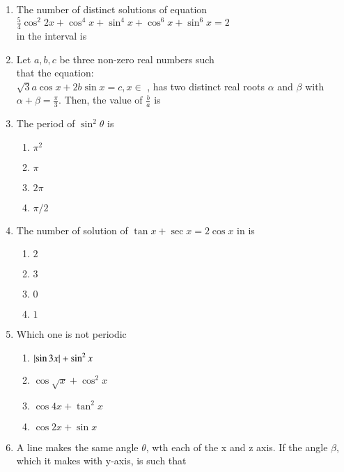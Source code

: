\begin{enumerate}[label=\thesubsection.\arabic*,ref=\thesubsection.\theenumi]
\item The number of distinct solutions of equation
$\frac{5}{4}\cos^2 2x+\cos^4 x+\sin^4 x+\cos^6 x+\sin^6 x=2$
\\in the interval  is\hfill{} 
\item Let $a, b, c$ be three non-zero real numbers such
\\
that the equation:
\\
$\sqrt{3} a\cos x+2b\sin x = c,x\in$ 
, has two distinct real roots $\alpha$ and $\beta$ with $\alpha+\beta=\frac{\pi}{3}$. Then, the value of $\frac{b}{a}$ is
\hfill{}
\item The period of $\sin^2 \theta$ is\hfill{} 
\begin{multicols}{4}
\begin{enumerate}
\item $\pi^2$
\columnbreak
\item $\pi$
\columnbreak
\item $2\pi$
\columnbreak
\item $\pi/2$
\end{enumerate}
\end{multicols}
\item The number of solution of $\tan x + \sec x=2\cos x$ in  is\hfill{} 
\begin{multicols}{4}
\begin{enumerate}
\item $2$
\columnbreak
\item $3$
\columnbreak
\item $0$
\columnbreak
\item $1$
\end{enumerate}
\end{multicols}
\item Which one is not periodic \hfill{}
\begin{multicols}{2} 
\begin{enumerate}
\item $\left\vert\sin3x\right\vert+\sin^2 x$
\item $\cos\sqrt{x}+\cos^2 x$
\columnbreak
\item $\cos4x+\tan^2 x$
\item $\cos2x+\sin x$
\end{enumerate}
\end{multicols}
\item A line makes the same angle $\theta$, wth each of the x and z axis. 
If the angle $\beta$, which it makes with y-axis, is such that

\end{enumerate}
